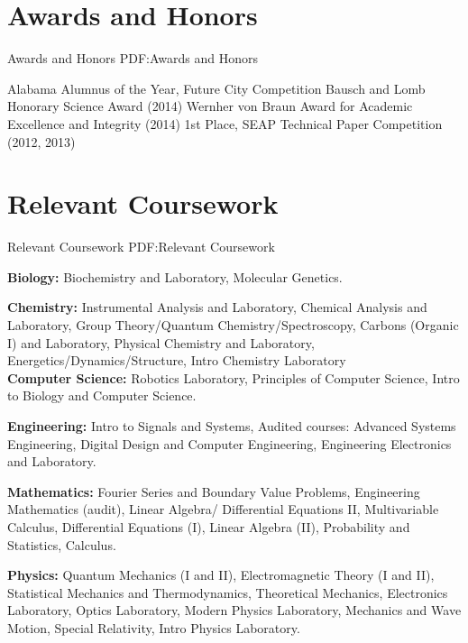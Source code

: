 \documentclass[letterpaper,10pt,oneside]{article}
\begin{document}
\begin{body}

\section
{Awards and Honors}
{Awards and Honors}
{PDF:Awards and Honors}

 Alabama Alumnus of the Year, Future City Competition 
\BulletItem
Bausch and Lomb Honorary Science Award (2014) 
\BulletItem
Wernher von Braun Award for Academic Excellence and Integrity (2014)
\BulletItem 
1st Place, SEAP Technical Paper Competition (2012, 2013)


\section
{Relevant Coursework}
{Relevant Coursework}
{PDF:Relevant Coursework}

\Gap
{\textbf{Biology:}}
Biochemistry and Laboratory,
Molecular Genetics.

\Gap
{\textbf{Chemistry:}}
Instrumental Analysis and Laboratory,
Chemical Analysis and Laboratory,
Group Theory/Quantum Chemistry/Spectroscopy,
Carbons (Organic I) and Laboratory,
Physical Chemistry and Laboratory,
Energetics/Dynamics/Structure,
Intro Chemistry Laboratory \\

\Gap
{\textbf{Computer Science:}}
Robotics Laboratory,
Principles of Computer Science,
Intro to Biology and Computer Science.

\Gap
{\textbf{Engineering:}}
Intro to Signals and Systems,
Audited courses:
Advanced Systems Engineering,
Digital Design and Computer Engineering,
Engineering Electronics and Laboratory.

\Gap
{\textbf{Mathematics:}}
Fourier Series and Boundary Value Problems,
Engineering Mathematics (audit),
Linear Algebra/ Differential Equations II,
Multivariable Calculus,
Differential Equations (I),
Linear Algebra (II),
Probability and Statistics,
Calculus.

{\textbf{Physics:}}
Quantum Mechanics (I and II),
Electromagnetic Theory (I and II),
Statistical Mechanics and Thermodynamics,
Theoretical Mechanics,
Electronics Laboratory,
Optics Laboratory,
Modern Physics Laboratory,
Mechanics and Wave Motion,
Special Relativity,
Intro Physics Laboratory.


\end{body}
\end{document}

